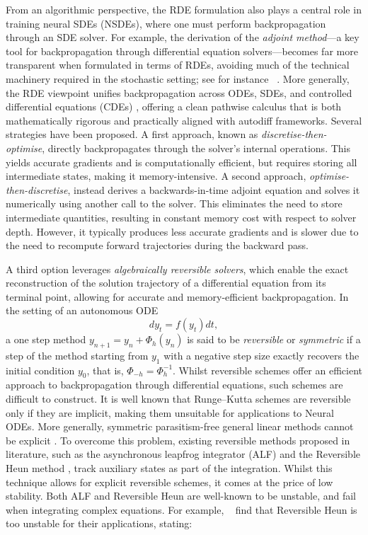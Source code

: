 \documentclass{article} %
\theoremstyle{definition}
\theoremstyle{remark}
\begin{document}
From an algorithmic perspective, the RDE formulation also plays a central role in training neural SDEs (NSDEs), where one must perform backpropagation through an SDE solver. For example, the derivation of the \emph{adjoint method}---a key tool for backpropagation through differential equation solvers---becomes far more transparent when formulated in terms of RDEs, avoiding much of the technical machinery required in the stochastic setting; see for instance ~\citep{cass_salvi_notes}. More generally, the RDE viewpoint unifies backpropagation across ODEs, SDEs, and controlled differential equations (CDEs) \citep{kidger2020neural}, offering a clean pathwise calculus that is both mathematically rigorous and practically aligned with autodiff frameworks.  Several strategies have been proposed. A first approach, known as \emph{discretise-then-optimise}, directly backpropagates through the solver’s internal operations. This yields accurate gradients and is computationally efficient, but requires storing all intermediate states, making it memory-intensive. A second approach, \emph{optimise-then-discretise}, instead derives a backwards-in-time adjoint equation and solves it numerically using another call to the solver. This eliminates the need to store intermediate quantities, resulting in constant memory cost with respect to solver depth. However, it typically produces less accurate gradients and is slower due to the need to recompute forward trajectories during the backward pass.

A third option leverages \emph{algebraically reversible solvers}, which enable the exact reconstruction of the solution trajectory of a differential equation from its terminal point, allowing for accurate and memory-efficient backpropagation. In the setting of an autonomous ODE
\begin{equation} \label{eq:ode}
    dy_t = f(y_t) dt,
\end{equation}
a one step method $y_{n+1} = y_n + \Phi_h(y_n)$ is said to be \emph{reversible} or \emph{symmetric} if a step of the method starting from $y_1$ with a negative step size exactly recovers the initial condition $y_0$, that is, $\Phi_{-h} = \Phi^{-1}_h$. Whilst reversible schemes offer an efficient approach to backpropagation through differential equations, such schemes are difficult to construct. It is well known that Runge--Kutta schemes are reversible only if they are implicit, making them unsuitable for applications to Neural ODEs. More generally, symmetric parasitism-free general linear methods cannot be explicit \citep{butcher2016symmetric}. To overcome this problem, existing reversible methods proposed in literature, such as the asynchronous leapfrog integrator (ALF) \citep{zhuang2021mali} and the Reversible Heun method \citep{kidger2021efficient}, track auxiliary states as part of the integration. Whilst this technique allows for explicit reversible schemes, it comes at the price of low stability. Both ALF and Reversible Heun are well-known to be unstable, and fail when integrating complex equations. For example,  ~\cite{zhang2021path} find that Reversible Heun is too unstable for their applications, stating:
\end{document}
